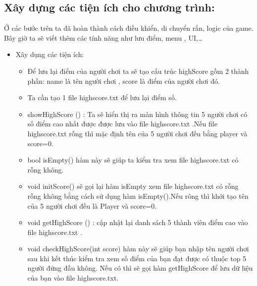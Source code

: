 \documentclass[13pt,a4paper]{article}
\begin{document}
\subsection{Xây dựng các tiện ích cho chương trình:}
\indent Ở các bước trên ta đã hoàn thành cách điều khiển, di chuyển rắn, logic của game. Bây giờ ta sẽ viết thêm các tính năng như lưu điểm, menu , UI,…
\begin{itemize}

    \item Xây dụng các tiện ích:
    \begin{itemize}
        \item Để lưu lại điểm của người chơi ta sẽ tạo cấu trúc highScore gồm 2 thành phần: name là tên người chơi , score là điểm của người chơi đó.
	    \item Ta cần tạo 1 file highscore.txt để lưu lại điểm số.
	    \item showHighScore () : Ta sẽ hiển thị ra màn hình thông tin 5 người chơi có số điểm cao nhất được  được lưu vào file highscore.txt .Nếu file highscore.txt rỗng thì mặc định tên của 5 người chơi đều bằng player và score=0.
	    \item bool isEmpty() hàm này sẽ giúp ta kiểm tra xem file highscore.txt có rỗng không.
	    \item void initScore() sẽ gọi lại hàm isEmpty xem file highscore.txt có rỗng rỗng không bằng cách sử dụng hàm isEmpty().Nếu rông thì khởi tạo tên của 5 người chơi đều là Player và score=0.
	    \item void getHighScore () : cập nhật lại danh sách 5 thành viên điểm cao vào file highscore.txt .
	    \item void checkHighScore(int score) hàm này sẽ giúp bạn nhập tên người chơi sau khi kết thúc kiểm tra xem số điểm của bạn đạt được có thuộc top 5 người đứng đầu không. Nếu có thì sẽ gọi hàm getHighScore để lưu dữ liệu của bạn vào file highscore.txt. 
    \end{itemize}
	

\end{itemize}
\end{document}
